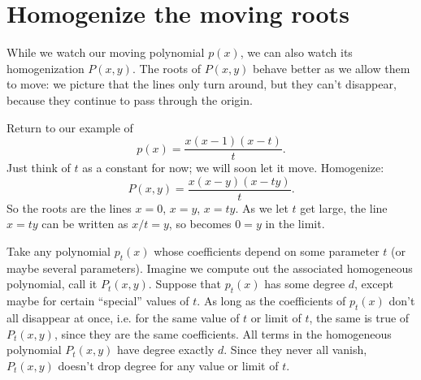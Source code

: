 \section{Homogenize the moving roots}
While we watch our moving polynomial \(p(x)\), we can also watch its homogenization \(P(x,y)\).
The roots of \(P(x,y)\) behave better as we allow them to move: we picture that the lines only turn around, but they can't disappear, because they continue to pass through the origin.
\begin{example}
Return to our example of 
\[
p(x)=\frac{x(x-1)(x-t)}{t}.
\]
Just think of \(t\) as a constant for now; we will soon let it move.
Homogenize:
\[
P(x,y)=\frac{x(x-y)(x-ty)}{t}.
\]
So the roots are the lines \(x=0\), \(x=y\), \(x=ty\).
As we let \(t\) get large, the line \(x=ty\) can be written as \(x/t=y\), so becomes \(0=y\) in the limit.
\end{example}
Take any polynomial \(p_t(x)\) whose coefficients depend on some parameter \(t\) (or maybe several parameters).
Imagine we compute out the associated homogeneous polynomial, call it \(P_t(x,y)\).
Suppose that \(p_t(x)\) has some degree \(d\), except maybe for certain ``special'' values of \(t\).
As long as the coefficients of \(p_t(x)\) don't all disappear at once, i.e. for the same value of \(t\) or limit of \(t\), the same is true of \(P_t(x,y)\), since they are the same coefficients.
All terms in the homogeneous polynomial \(P_t(x,y)\) have degree exactly \(d\).
Since they never all vanish, \(P_t(x,y)\) doesn't drop degree for any value or limit of \(t\).
